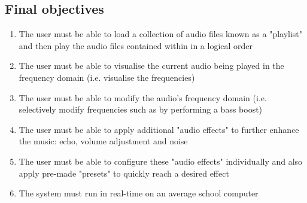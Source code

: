 \pagebreak
\subsection{Final objectives}
\begin{enumerate}
	\item  The user must be able to load a collection of audio files known as a "playlist" and then play the audio files contained within in a logical order
	\item  The user must be able to visualise the current audio being played in the frequency domain (i.e. visualise the frequencies)
	\item The user must be able to modify the audio's frequency domain (i.e. selectively modify frequencies such as by performing a bass boost)
	\item The user must be able to apply additional "audio effects" to further enhance the music: echo, volume adjustment and noise
	\item The user must be able to configure these "audio effects" individually and also apply pre-made "presets" to quickly reach a desired effect
	\item  The system must run in real-time on an average school computer
\end{enumerate}